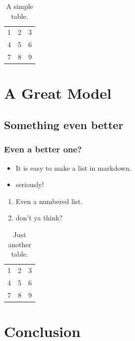 \documentclass[oneside,phd,]{snuthesis}
\providecommand{\tightlist}{%
  \setlength{\itemsep}{0pt}\setlength{\parskip}{0pt}}
\begin{document}
\begin{table}
\caption{A simple table.}
\begin{center}
\begin{tabular}{ l | c | r }
  1 & 2 & 3 \\
  4 & 5 & 6 \\
  7 & 8 & 9 \\
\end{tabular}
\end{center}
\end{table}

\chapter{A Great Model}\label{a-great-model}

\section{Something even better}\label{something-even-better}

\subsection{Even a better one?}\label{even-a-better-one}

\begin{itemize}
\tightlist
\item
  It is easy to make a list in markdown.
\item
  seriously!
\end{itemize}

\begin{enumerate}
\def\labelenumi{\arabic{enumi}.}
\tightlist
\item
  Even a numbered list.
\item
  don't ya think?
\end{enumerate}

\begin{table}
\caption{Just another table.}
\begin{center}
\begin{tabular}{ l | c | r }
  1 & 2 & 3 \\
  4 & 5 & 6 \\
  7 & 8 & 9 \\
\end{tabular}
\end{center}
\end{table}

\chapter{Conclusion}\label{conclusion}
\end{document}
